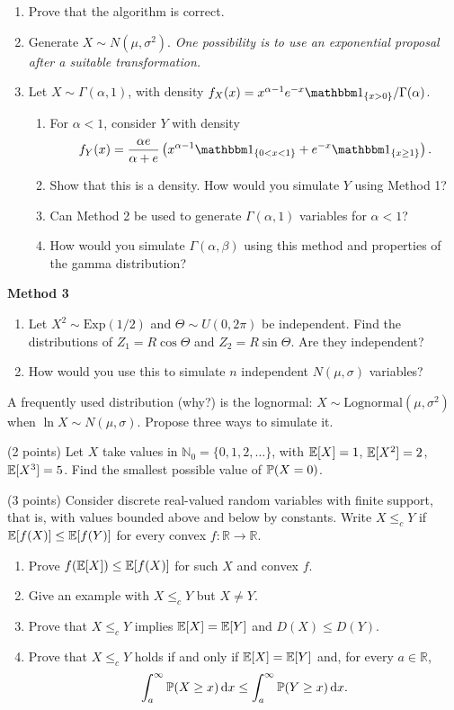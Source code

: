 \documentclass[a4paper]{report}
\begin{document}
\begin{problem}
\begin{enumerate}
\item Prove that the algorithm is correct.
\item Generate $X\sim N(\mu,\sigma^2)$. \emph{One possibility is to use an exponential proposal after a suitable transformation.}
\item Let $X\sim\Gamma(\alpha,1)$, with density $f_X(x)=x^{\alpha-1}e^{-x}\mathbbm1_{\{x>0\}}/\Gamma(\alpha)$.
\begin{enumerate}
\item For $\alpha<1$, consider $Y$ with density
\[f_Y(x)=\frac{\alpha e}{\alpha+e}\left(x^{\alpha-1}\mathbbm1_{\{0<x<1\}}+e^{-x}\mathbbm1_{\{x\geq1\}}\right).\]
\item Show that this is a density. How would you simulate $Y$ using Method 1?
\item Can Method 2 be used to generate $\Gamma(\alpha,1)$ variables for $\alpha<1$?
\item How would you simulate $\Gamma(\alpha,\beta)$ using this method and properties of the gamma distribution?
\end{enumerate}
\end{enumerate}
\textbf{Method 3}
\begin{enumerate}
\item Let $X^2\sim\mathrm{Exp}(1/2)$ and $\Theta\sim U(0,2\pi)$ be independent. Find the distributions of $Z_1=R\cos\Theta$ and $Z_2=R\sin\Theta$. Are they independent?
\item How would you use this to simulate $n$ independent $N(\mu,\sigma)$ variables?
\end{enumerate}
A frequently used distribution (why?) is the lognormal: $X\sim\mathrm{Lognormal}(\mu,\sigma^2)$ when $\ln X\sim N(\mu,\sigma)$. Propose three ways to simulate it.
\end{problem}
\begin{problem} (2 points)
Let $X$ take values in $\mathbb N_0=\{0,1,2,\ldots\}$, with $\E[X]=1$, $\E[X^2]=2$, $\E[X^3]=5$. Find the smallest possible value of $\P(X=0)$.
\end{problem}
\begin{problem} (3 points)
Consider discrete real-valued random variables with finite support, that is, with values bounded above and below by constants. Write $X\leq_cY$ if $\E[f(X)]\leq\E[f(Y)]$ for every convex $f:\mathbb R\to\mathbb R$.
\begin{enumerate}
\item Prove $f(\E[X])\leq\E[f(X)]$ for such $X$ and convex $f$.
\item Give an example with $X\leq_cY$ but $X\neq Y$.
\item Prove that $X\leq_cY$ implies $\E[X]=\E[Y]$ and $D(X)\leq D(Y)$.
\item Prove that $X\leq_cY$ holds if and only if $\E[X]=\E[Y]$ and, for every $a\in\mathbb R$,
\[\int_a^\infty\P(X\geq x)\,\mathrm dx\leq\int_a^\infty\P(Y\geq x)\,\mathrm dx.\]
\end{enumerate}
\end{problem}
\end{document}
